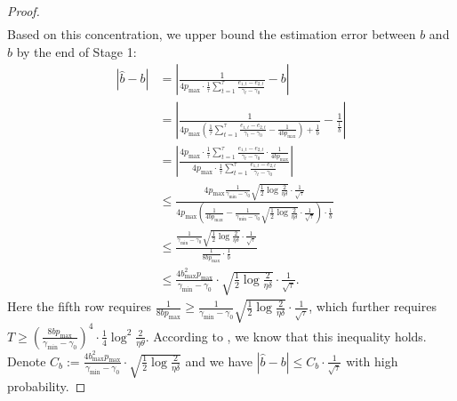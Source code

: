 \begin{proof}
\begin{equation}
\begin{aligned}
        \end{aligned}
    \end{equation}
    Based on this concentration, we upper bound the estimation error between $b$ and $\hat b$ by the end of Stage 1:
    \begin{equation}
        \label{eq:error_b}
        \begin{aligned}
            |\hat b - b|&=|\frac1{4p_{\max}\cdot\frac1{\tau}\sum_{t=1}^{\tau}\frac{e_{1,t}-e_{2,t}}{\gamma_t - \gamma_0}} - b|\\
            &=|\frac1{4p_{\max}(\frac1{\tau}\sum_{t=1}^{\tau}\frac{e_{1,t}-e_{2,t}}{\gamma_t - \gamma_0} - \frac1{4bp_{\max}}) + \frac1b}-\frac1{\frac1b}|\\
            &=|\frac{4p_{\max}\cdot\frac1{\tau}\sum_{t=1}^{\tau}\frac{e_{1,t}-e_{2,t}}{\gamma_t - \gamma_0}\cdot\frac1{4bp_{\max}}}{4p_{\max}\cdot\frac1{\tau}\sum_{t=1}^{\tau}\frac{e_{1,t}-e_{2,t}}{\gamma_t - \gamma_0}}|\\
            &\leq\frac{4p_{\max}\frac1{\gamma_{\min}-\gamma_0}\sqrt{\frac12\log\frac2{\eta\delta}}\cdot\frac1{\sqrt{\tau}}}{4p_{\max}(\frac1{4bp_{\max}}-\frac1{\gamma_{\min}-\gamma_0}\sqrt{\frac12\log\frac2{\eta\delta}}\cdot\frac1{\sqrt{\tau}})\cdot\frac1b}\\
            &\leq\frac{\frac1{\gamma_{\min}-\gamma_0}\sqrt{\frac12\log\frac2{\eta\delta}}\cdot\frac1{\sqrt{\tau}}}{\frac1{8bp_{\max}}\cdot\frac1b}\\
            &\leq\frac{4b_{\max}^2p_{\max}}{\gamma_{\min} - \gamma_0}\cdot\sqrt{\frac12\log\frac2{\eta\delta}}\cdot\frac1{\sqrt{\tau}}.
        \end{aligned}
    \end{equation}
    Here the fifth row requires $\frac1{8bp_{\max}}\geq \frac1{\gamma_{\min}-\gamma_0}\sqrt{\frac12\log\frac2{\eta\delta}}\cdot\frac1{\sqrt{\tau}}$, which further requires $T\geq (\frac{8bp_{\max}}{\gamma_{\min}-\gamma_0})^4\cdot\frac14\log^2\frac2{\eta\theta}$. According to , we know that this inequality holds. Denote $C_b:=\frac{4b_{\max}^2p_{\max}}{\gamma_{\min} - \gamma_0}\cdot\sqrt{\frac12\log\frac2{\eta\delta}}$ and we have $|\hat b - b|\leq C_b\cdot\frac1{\sqrt{\tau}}$ with high probability.



\end{proof}
